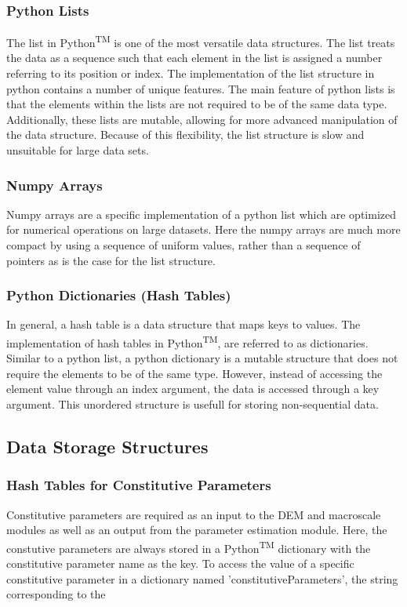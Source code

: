 \subsubsection*{Python Lists}
The list in Python\textsuperscript{TM} is one of the most versatile data structures. The list treats the data as a sequence such that each element in the list is assigned a number referring to its position or index.  The implementation of the list structure in python contains a number of unique features. The main feature of python lists is that the elements within the lists are not required to be of the same data type. Additionally, these lists are mutable, allowing for more advanced manipulation of the data structure. Because of this flexibility, the list structure is slow and unsuitable for large data sets. 

\subsubsection*{Numpy Arrays}
Numpy arrays are a specific implementation of a python list which are optimized for numerical operations on large datasets. Here the numpy arrays are much more compact by using a sequence of uniform values, rather than a sequence of pointers as is the case for the list structure.

\subsubsection*{Python Dictionaries (Hash Tables)}
In general, a hash table is a data structure that maps keys to values. The implementation of hash tables in Python\textsuperscript{TM}, are referred to as dictionaries. Similar to a python list, a python dictionary is a mutable structure that does not require the elements to be of the same type. However, instead of accessing the element value through an index argument, the data is accessed through a key argument. This unordered structure is usefull for storing non-sequential data.

\subsection{Data Storage Structures}


\subsubsection*{Hash Tables for Constitutive Parameters}

Constitutive parameters are required as an input to the DEM and macroscale modules as well as an output from the parameter estimation module. Here, the constutive parameters are always stored in a Python\textsuperscript{TM} dictionary with the constitutive parameter name as the key. To access the value of a specific constitutive parameter in a dictionary named 'constitutiveParameters', the string corresponding to the 

